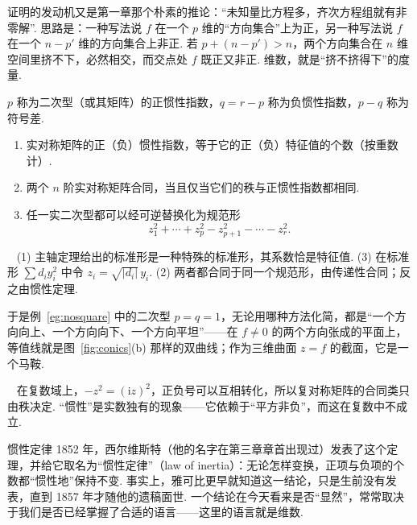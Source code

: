 \documentclass[lang=cn,10.5pt,scheme=chinese,toc=twocol,section,chinesefont=nofont,
twoside,citestyle=gb7714-2015,bibstyle=gb7714-2015]{elegantbook}
\DeclareRobustCommand{\textbf}[1]{{\lnsemiboldlatin\lnsemiboldcjk #1}}
\numberwithin{equation}{section}   %
\newcommand*{\lnlabel}[1]{{\sffamily\bfseries\color{black}#1}}
\renewenvironment{proof}{%
	\par\noindent\lnlabel{\proofname}\;\ \color{black!90}\cfs}{\par}
\renewenvironment{remark}{\noindent\lnlabel{\remarkname}\ }{\par}
\begin{document}
\begin{motivebox}
  证明的发动机又是第一章那个朴素的推论：“未知量比方程多，齐次方程组就有非零解”. 思路是：一种写法说 $f$ 在一个 $p$ 维的“方向集合”上为正，另一种写法说 $f$ 在一个 $n-p'$ 维的方向集合上非正. 若 $p+(n-p')>n$，两个方向集合在 $n$ 维空间里挤不下，必然相交，而交点处 $f$ 既正又非正. 维数，就是“挤不挤得下”的度量.
\end{motivebox}

\begin{definition}
  $p$ 称为二次型（或其矩阵）的\textbf{正惯性指数}，$q=r-p$ 称为\textbf{负惯性指数}，$p-q$ 称为\textbf{符号差}.
\end{definition}

\begin{corollary}
  \label{cor:inertiaeig}
  \begin{enumerate}
    \item 实对称矩阵的正（负）惯性指数，等于它的正（负）特征值的个数（按重数计）.
    \item 两个 $n$ 阶实对称矩阵合同，当且仅当它们的秩与正惯性指数都相同.
    \item 任一实二次型都可以经可逆替换化为\textbf{规范形}
          \[z_1^2+\cdots+z_p^2-z_{p+1}^2-\cdots-z_r^2.\]
  \end{enumerate}
\end{corollary}
\begin{proof}
  (1) 主轴定理给出的标准形是一种特殊的标准形，其系数恰是特征值. (3) 在标准形 $\sum d_iy_i^2$ 中令 $z_i=\sqrt{|d_i|}\,y_i$. (2) 两者都合同于同一个规范形，由传递性合同；反之由惯性定理.
\end{proof}

于是例~\ref{eg:nosquare} 中的二次型 $p=q=1$，无论用哪种方法化简，都是“一个方向向上、一个方向向下、一个方向平坦”——在 $f\ne0$ 的两个方向张成的平面上，等值线就是图~\ref{fig:conics}(b) 那样的双曲线；作为三维曲面 $z=f$ 的截面，它是一个马鞍.

\begin{remark}
  在复数域上，$-z^2=(\mathrm iz)^2$，正负号可以互相转化，所以复对称矩阵的合同类只由秩决定. “惯性”是\textbf{实数}独有的现象——它依赖于“平方非负”，而这在复数中不成立.
\end{remark}

\begin{historybox}{惯性定律}
  1852 年，西尔维斯特（他的名字在第三章章首出现过）发表了这个定理\cite{sylvester1852demonstration}，并给它取名为“惯性定律”（law of inertia）：无论怎样变换，正项与负项的个数都“惯性地”保持不变. 事实上，雅可比更早就知道这一结论，只是生前没有发表，直到 1857 年才随他的遗稿面世\cite{jacobi1857fundamentalsatz}. 一个结论在今天看来是否“显然”，常常取决于我们是否已经掌握了合适的语言——这里的语言就是维数.
\end{historybox}
\end{document}
